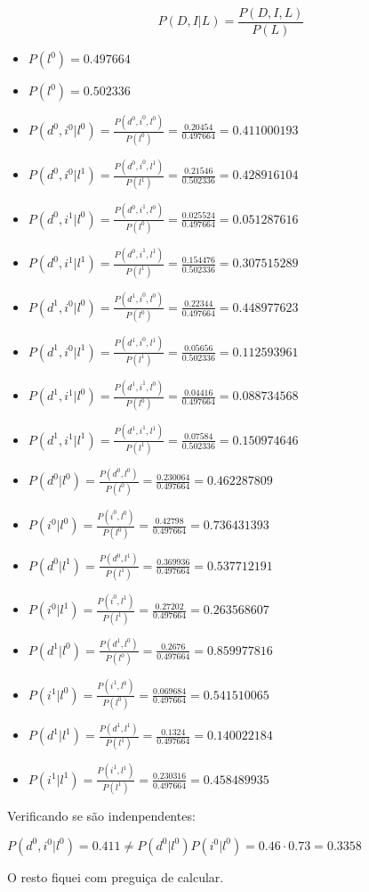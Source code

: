 \[P(D,I|L) = \frac{{P(D,I,L)}}{{P(L)}}\]

\begin{itemize}
    \item $P(l^0) = 0.497664$
    \item $P(l^0) = 0.502336$
\end{itemize}

\begin{itemize}
    \item $P({d^0},{i^0}|{l^0}) = \frac{{P({d^0},{i^0},{l^0})}}{{P({l^0})}} = \frac{{0.20454}}{{0.497664}} = 0.411000193$
    \item $P({d^0},{i^0}|{l^1}) = \frac{{P({d^0},{i^0},{l^1})}}{{P({l^1})}} = \frac{{0.21546}}{{0.502336}} = 0.428916104$
    \item $P({d^0},{i^1}|{l^0}) = \frac{{P({d^0},{i^1},{l^0})}}{{P({l^0})}} = \frac{{0.025524}}{{0.497664}} = 0.051287616$
    \item $P({d^0},{i^1}|{l^1}) = \frac{{P({d^0},{i^1},{l^1})}}{{P({l^1})}} = \frac{{0.154476}}{{0.502336}} = 0.307515289$
    \item $P({d^1},{i^0}|{l^0}) = \frac{{P({d^1},{i^0},{l^0})}}{{P({l^0})}} = \frac{{0.22344}}{{0.497664}} = 0.448977623$
    \item $P({d^1},{i^0}|{l^1}) = \frac{{P({d^1},{i^0},{l^1})}}{{P({l^1})}} = \frac{{0.05656}}{{0.502336}} = 0.112593961$
    \item $P({d^1},{i^1}|{l^0}) = \frac{{P({d^1},{i^1},{l^0})}}{{P({l^0})}} = \frac{{0.04416}}{{0.497664}} = 0.088734568$
    \item $P({d^1},{i^1}|{l^1}) = \frac{{P({d^1},{i^1},{l^1})}}{{P({l^1})}} = \frac{{0.07584}}{{0.502336}} = 0.150974646$
\end{itemize}

\begin{itemize}
	\item $P({d^0}|{l^0}) = \frac{{P({d^0},{l^0})}}{{P({l^0})}} = \frac{{0.230064}}{{0.497664}} = 0.462287809$
	\item $P({i^0}|{l^0}) = \frac{{P({i^0},{l^0})}}{{P({l^0})}} = \frac{{0.42798}}{{0.497664}} = 0.736431393$
	\item $P({d^0}|{l^1}) = \frac{{P({d^0},{l^1})}}{{P({l^1})}} = \frac{{0.369936}}{{0.497664}} = 0.537712191$
	\item $P({i^0}|{l^1}) = \frac{{P({i^0},{l^1})}}{{P({l^1})}} = \frac{{0.27202}}{{0.497664}} = 0.263568607$
	\item $P({d^1}|{l^0}) = \frac{{P({d^1},{l^0})}}{{P({l^0})}} = \frac{{0.2676}}{{0.497664}} = 0.859977816$
	\item $P({i^1}|{l^0}) = \frac{{P({i^1},{l^0})}}{{P({l^0})}} = \frac{{0.069684}}{{0.497664}} = 0.541510065$
	\item $P({d^1}|{l^1}) = \frac{{P({d^1},{l^1})}}{{P({l^1})}} = \frac{{0.1324}}{{0.497664}} = 0.140022184$
	\item $P({i^1}|{l^1}) = \frac{{P({i^1},{l^1})}}{{P({l^1})}} = \frac{{0.230316}}{{0.497664}} = 0.458489935$
\end{itemize}

Verificando se são indenpendentes:

$P({d^0},{i^0}|{l^0}) = 0.411 \ne P({d^0}|{l^0})P({i^0}|{l^0}) = 0.46 \cdot 0.73 = 0.3358$

O resto fiquei com preguiça de calcular.